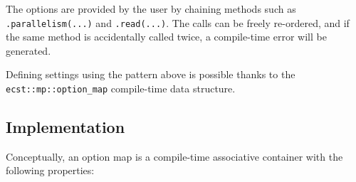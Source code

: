 \documentclass[twoside, 12pt, a4paper, openany]{book}
\begin{document}
The options are provided by the user by chaining methods such as
\texttt{.parallelism(...)}
and
\texttt{.read(...)}.
The calls can be freely re-ordered, and if the same method is
accidentally called twice, a compile-time error will be generated.

Defining settings using the pattern above is possible thanks to the
\texttt{ecst::mp::option_map}
compile-time data structure.

\subsection{Implementation}\label{implementation-4}

Conceptually, an option map is a compile-time associative container with
the following properties:
\end{document}
